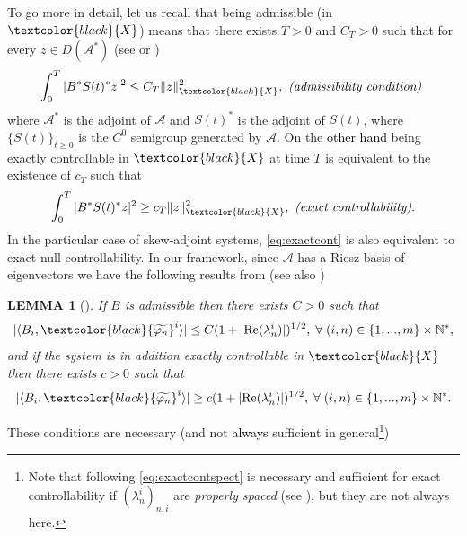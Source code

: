\documentclass[11pt, dvipsnames]{amsart}
\newtheorem{lem}[theorem]{LEMMA}
\begin{document}
To go more in detail, let us recall that being admissible (in $\textcolor{black}{X}$) means that there exists $T>0$ and $C_{T}>0$ such that for every $z\in D(\mathcal{A}^{*})$ (see \cite[Section 2.3]{coron2007control} or \cite{tucsnak2009observation})
\begin{equation}
\label{eq:admissible0}
\int_{0}^{T}|B^{*}S(t)^{*}z|^{2}\leq C_{T}\|z\|_{\textcolor{black}{X}}^{2},\text{  \emph{(admissibility condition)} }
\end{equation}
where $\mathcal{A}^{*}$ is the adjoint of $\mathcal{A}$ and $S(t)^{*}$ is the adjoint of $S(t)$, where $\{S(t)\}_{t\geq0}$ is the $C^{0}$ semigroup generated by $\mathcal{A}$. On the \textcolor{black}{other hand} being exactly controllable in $\textcolor{black}{X}$ at time $T$ is equivalent to the existence of $c_{T}$ such that
\begin{equation}
\label{eq:exactcont}
    \int_{0}^{T}|B^{*}S(t)^{*}z|^{2}\geq c_{T}\|z\|_{\textcolor{black}{X}}^{2},\text{  \emph{(exact controllability)}}.
\end{equation}
In the particular case of skew-adjoint systems, \eqref{eq:exactcont} is also equivalent to exact null controllability.
In our framework, since $\mathcal{A}$ has a Riesz basis of eigenvectors we have
the following results from \cite{weiss2011eigenvalues} (see also \cite{russell1994general})
\begin{lem}[\cite{weiss2011eigenvalues}]
\label{lem:weiss}
If $B$ is admissible then there exists $C>0$ such that
\begin{equation}
\label{eq:admissible}
|\langle  B_i,\textcolor{black}{\widetilde{\varphi_{n}}}^{i} \rangle|\leq C(1+|\text{Re}(\lambda_{n}^{i})|)^{1/2},\;\forall\;(i,n)\in\{1,...,m\}\times\mathbb{N}^{*},
\end{equation}
and if the system is in addition exactly controllable in $\textcolor{black}{X}$ then there exists $c>0$ such that
\begin{equation}
\label{eq:exactcontspect}
|\langle  B_i,\textcolor{black}{\widetilde{\varphi_{n}}}^{i} \rangle|\geq c(1+|\text{Re}(\lambda_{n}^{i})|)^{1/2},\;\forall\;(i,n)\in\{1,...,m\}\times\mathbb{N}^{*}.
\end{equation}
\end{lem}
These conditions are necessary (and not \textcolor{black}{always} sufficient \cite{hansen1997new} in general\footnote{Note that following \cite{weiss2011eigenvalues} \eqref{eq:exactcontspect} is necessary and sufficient for exact controllability if $(\lambda_{n}^{i})_{n,i}$ are \emph{properly spaced} (see \cite[Proposition 3.4]{weiss2011eigenvalues}), but they are not always here.}) 
\end{document}
